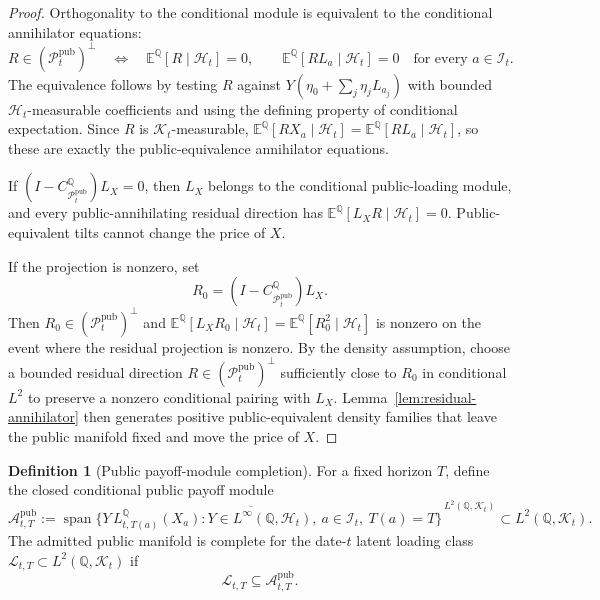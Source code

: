 \documentclass[11pt,a4paper]{amsart}
\theoremstyle{plain}
\theoremstyle{definition}
\newtheorem{definition}[theorem]{Definition}
\theoremstyle{remark}
\DeclareMathOperator{\Span}{span}
\newcommand{\QQ}{\mathbb{Q}}
\newcommand{\EE}{\mathbb{E}}
\newcommand{\cA}{\mathcal{A}}
\newcommand{\cH}{\mathcal{H}}
\newcommand{\cI}{\mathcal{I}}
\newcommand{\cK}{\mathcal{K}}
\newcommand{\cL}{\mathcal{L}}
\newcommand{\cP}{\mathcal{P}}
\begin{document}
\begin{proof}
Orthogonality to the conditional module is equivalent to the conditional annihilator equations:
\[
        R\in(\cP_t^{\mathrm{pub}})^\perp
        \quad\Longleftrightarrow\quad
        \EE^\QQ[R\mid\cH_t]=0,
        \qquad
        \EE^\QQ[RL_a\mid\cH_t]=0\quad\text{for every }a\in\cI_t .
\]
The equivalence follows by testing \(R\) against
\(Y(\eta_0+\sum_j\eta_jL_{a_j})\) with bounded \(\cH_t\)-measurable coefficients and using the
defining property of conditional expectation.  Since \(R\) is \(\cK_t\)-measurable,
\(\EE^\QQ[RX_a\mid\cH_t]=\EE^\QQ[RL_a\mid\cH_t]\), so these are exactly the public-equivalence
annihilator equations.

If \((I-C_{\cP_t^{\mathrm{pub}}}^\QQ)L_X=0\), then \(L_X\) belongs to the conditional
public-loading module, and every public-annihilating residual direction has
\(\EE^\QQ[L_XR\mid\cH_t]=0\).  Public-equivalent tilts cannot change the price of \(X\).

If the projection is nonzero, set
\[
        R_0=(I-C_{\cP_t^{\mathrm{pub}}}^\QQ)L_X .
\]
Then \(R_0\in(\cP_t^{\mathrm{pub}})^\perp\) and
\(\EE^\QQ[L_XR_0\mid\cH_t]=\EE^\QQ[R_0^2\mid\cH_t]\) is nonzero on the event where the residual
projection is nonzero.  By the density assumption, choose a bounded residual direction
\(R\in(\cP_t^{\mathrm{pub}})^\perp\) sufficiently close to \(R_0\) in conditional \(L^2\) to
preserve a nonzero conditional pairing with \(L_X\).  Lemma~\ref{lem:residual-annihilator} then
generates positive public-equivalent density families that leave the public manifold fixed and
move the price of \(X\).
\end{proof}

\begin{definition}[Public payoff-module completion]\label{def:public-completion}
For a fixed horizon \(T\), define the closed conditional public payoff module
\[
        \cA_{t,T}^{\mathrm{pub}}
        :=
        \overline{\Span\{Y\,L_{t,T(a)}^\QQ(X_a):
        Y\in L^\infty(\QQ,\cH_t),\ a\in\cI_t,\ T(a)=T\}}^{\,L^2(\QQ,\cK_t)}
        \subset L^2(\QQ,\cK_t).
\]
The admitted public manifold is complete for the date-\(t\) latent loading class
\(\cL_{t,T}\subset L^2(\QQ,\cK_t)\) if
\[
        \cL_{t,T}\subseteq \cA_{t,T}^{\mathrm{pub}}.
\]
\end{definition}
\end{document}
